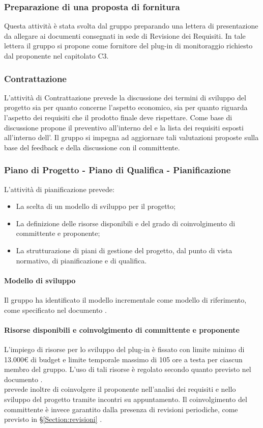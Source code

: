\subsubsection{Preparazione di una proposta di fornitura}
Questa attività è stata svolta dal gruppo \groupName{} preparando una lettera di presentazione da allegare ai documenti consegnati in sede di Revisione dei Requisiti. In tale lettera il gruppo si propone come fornitore del plug-in di monitoraggio \projectName{} richiesto dal proponente \proposerName{} nel capitolato C3.


\subsubsection{Contrattazione}
L'attività di Contrattazione prevede la discussione dei termini di sviluppo del progetto sia per quanto concerne l'aspetto economico, sia per quanto riguarda l'aspetto dei requisiti che il prodotto finale deve rispettare. Come base di discussione \groupName{} propone il preventivo all'interno del \docNameVersionPdP{} e la lista dei requisiti esposti all'interno dell'\docNameVersionAdR{}. Il gruppo si impegna ad aggiornare tali valutazioni proposte sulla base del feedback e della discussione con il committente.

\subsubsection{Piano di Progetto - Piano di Qualifica - Pianificazione}\label{paragraph:PdP}
L'attività di pianificazione prevede: 
	\begin{itemize}
		\item La scelta di un modello di sviluppo per il progetto;
		\item La definizione delle risorse disponibili e del grado di coinvolgimento di committente e proponente;
		\item La strutturazione di piani di gestione del progetto, dal punto di vista normativo, di pianificazione e di qualifica.
	\end{itemize}
\paragraph{Modello di sviluppo}
Il gruppo ha identificato il modello incrementale come modello di riferimento, come specificato nel documento \docNameVersionPdP{}.
\paragraph{Risorse disponibili e coinvolgimento di committente e proponente}
L'impiego di risorse per lo sviluppo del plug-in è fissato con limite minimo di 13.000\euro{} di budget e limite temporale massimo di 105 ore a testa per ciascun membro del gruppo. L'uso di tali risorse è regolato secondo quanto previsto nel documento \docNameVersionPdP{}.\\
 \groupName{} prevede inoltre di coinvolgere il proponente \proposerName{}  nell'analisi dei requisiti e nello sviluppo del progetto \projectName{} tramite incontri su appuntamento. Il coinvolgimento del committente è invece garantito dalla presenza di revisioni periodiche, come previsto in §\ref{Section:revisioni} .
